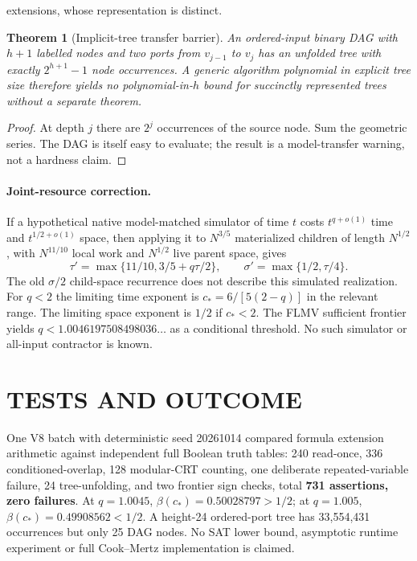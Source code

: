 \documentclass[11pt]{article}
\newtheorem{theorem}{Theorem}
\begin{document}
extensions, whose representation is distinct.
\begin{theorem}[Implicit-tree transfer barrier]
An ordered-input binary DAG with $h+1$ labelled nodes and two
ports from $v_{j-1}$ to $v_j$ has an unfolded tree with exactly
$2^{h+1}-1$ node occurrences. A generic algorithm polynomial
in explicit tree size therefore yields no polynomial-in-$h$
bound for succinctly represented trees without a separate theorem.
\end{theorem}
\begin{proof}
At depth $j$ there are $2^j$ occurrences of the source node.
Sum the geometric series. The DAG is itself easy to evaluate;
the result is a model-transfer warning, not a hardness claim.
\end{proof}
\paragraph{Joint-resource correction.}
If a hypothetical native model-matched simulator of time $t$ costs
$t^{q+o(1)}$ time and $t^{1/2+o(1)}$ space, then applying it
to $N^{3/5}$ materialized children of length $N^{1/2}$, with
$N^{11/10}$ local work and $N^{1/2}$ live parent space, gives
\[
 \tau'=\max\{11/10,3/5+q\tau/2\},\qquad
 \sigma'=\max\{1/2,\tau/4\}.
\]
The old $\sigma/2$ child-space recurrence does not describe this
simulated realization. For $q<2$ the limiting time exponent is
$c_*=6/[5(2-q)]$ in the relevant range. The limiting space
exponent is $1/2$ if $c_*<2$. The FLMV sufficient frontier yields
$q<1.0046197508498036\ldots$ as a conditional threshold.
No such simulator or all-input contractor is known.
\section{TESTS AND OUTCOME}
One V8 batch with deterministic seed 20261014 compared formula
extension arithmetic against independent full Boolean truth tables:
240 read-once, 336 conditioned-overlap, 128 modular-CRT counting,
one deliberate repeated-variable failure, 24 tree-unfolding, and two
frontier sign checks, total \textbf{731 assertions, zero failures}.
At $q=1.0045$, $\beta(c_*)=0.50028797>1/2$; at $q=1.005$,
$\beta(c_*)=0.49908562<1/2$. A height-24 ordered-port tree
has 33,554,431 occurrences but only 25 DAG nodes.
No SAT lower bound, asymptotic runtime experiment or full
Cook--Mertz implementation is claimed.
\end{document}
